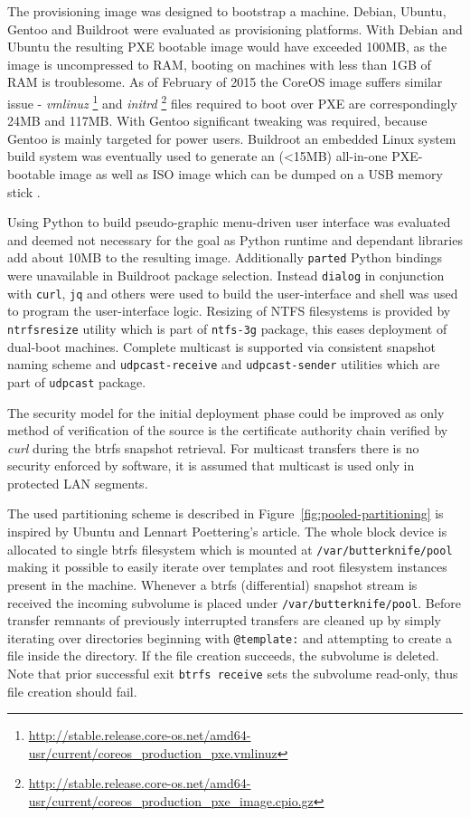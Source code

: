 \documentclass[a4paper,11pt]{kth-mag}
\begin{document}
The provisioning image was designed to bootstrap a machine.
Debian, Ubuntu, Gentoo and Buildroot were evaluated as
provisioning platforms.
With Debian and Ubuntu the resulting PXE bootable
image would have exceeded 100MB, as the image
is uncompressed to RAM, booting on machines with
less than 1GB of RAM is troublesome.
As of February of 2015 the CoreOS image suffers similar issue -
\emph{vmlinuz}
\footnote{\url{http://stable.release.core-os.net/amd64-usr/current/coreos_production_pxe.vmlinuz}}
and
\emph{initrd}
\footnote{\url{http://stable.release.core-os.net/amd64-usr/current/coreos_production_pxe_image.cpio.gz}}
files required to boot over PXE are correspondingly 24MB and 117MB.
With Gentoo significant tweaking was required, because Gentoo is
mainly targeted for power users.
Buildroot
an embedded Linux system build system
was eventually used to generate an (<15MB)
all-in-one PXE-bootable image as well as ISO image
which can be dumped on a USB memory stick \cite{tools-for-embedded-linux-dev}.

Using Python to build pseudo-graphic menu-driven user interface was
evaluated and deemed not necessary for the goal as Python runtime and
dependant libraries add about 10MB to the resulting image.
Additionally \lstinline!parted! Python bindings were unavailable
in Buildroot package selection.
Instead \lstinline!dialog! in conjunction with
\lstinline!curl!, \lstinline!jq! and others were used to build the user-interface
and shell was used to program the user-interface logic.
Resizing of NTFS filesystems is provided by \lstinline!ntrfsresize! utility
which is part of \lstinline!ntfs-3g! package, this eases deployment of
dual-boot machines.
Complete multicast is supported via consistent snapshot naming scheme
and \lstinline!udpcast-receive! and \lstinline!udpcast-sender! utilities which
are part of \lstinline!udpcast! package.

The security model for the initial deployment phase could be improved
as only method of verification of the source is the certificate
authority chain verified by \emph{curl} during the \acrshort{btrfs} snapshot
retrieval. For multicast transfers there is no security
enforced by software, it is assumed that multicast is used only
in protected LAN segments.

The used partitioning scheme is described in Figure~\ref{fig:pooled-partitioning}
is inspired by Ubuntu and Lennart Poettering's article.
\cite{revisiting-how-we-put-together-linux-systems}
The whole block device is allocated to single \acrshort{btrfs} filesystem
which is mounted at \lstinline!/var/butterknife/pool! making
it possible to easily iterate over templates and root filesystem instances
present in the machine.
Whenever a \acrshort{btrfs} (differential) snapshot stream is received
the incoming subvolume is placed under \lstinline!/var/butterknife/pool!.
Before transfer remnants of previously interrupted transfers are cleaned
up by simply iterating over directories beginning with \lstinline!@template:!
and attempting to create a file inside the directory.
If the file creation succeeds, the subvolume is deleted.
Note that prior successful exit \lstinline!btrfs receive! sets the
subvolume read-only, thus file creation should fail.
\end{document}

